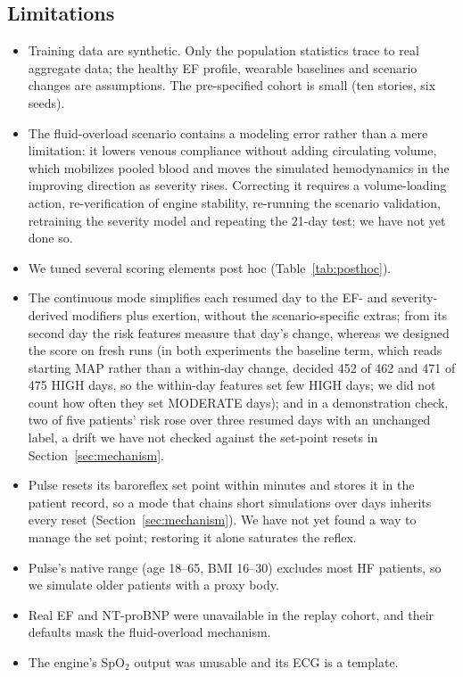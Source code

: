 \documentclass[conference]{IEEEtran}
\begin{document}
\subsection{Limitations}\label{sec:limits}
\begin{itemize}
\item Training data are synthetic. Only the population statistics trace to real aggregate data; the healthy EF profile, wearable baselines and scenario changes are assumptions. The pre-specified cohort is small (ten stories, six seeds).
\item The fluid-overload scenario contains a modeling error rather than a mere limitation: it lowers venous compliance without adding circulating volume, which mobilizes pooled blood and moves the simulated hemodynamics in the improving direction as severity rises. Correcting it requires a volume-loading action, re-verification of engine stability, re-running the scenario validation, retraining the severity model and repeating the 21-day test; we have not yet done so.
\item We tuned several scoring elements post hoc (Table~\ref{tab:posthoc}).
\item The continuous mode simplifies each resumed day to the EF- and severity-derived modifiers plus exertion, without the scenario-specific extras; from its second day the risk features measure that day's change, whereas we designed the score on fresh runs (in both experiments the baseline term, which reads starting MAP rather than a within-day change, decided 452 of 462 and 471 of 475 HIGH days, so the within-day features set few HIGH days; we did not count how often they set MODERATE days); and in a demonstration check, two of five patients' risk rose over three resumed days with an unchanged label, a drift we have not checked against the set-point resets in Section~\ref{sec:mechanism}.
\item Pulse resets its baroreflex set point within minutes and stores it in the patient record, so a mode that chains short simulations over days inherits every reset (Section~\ref{sec:mechanism}). We have not yet found a way to manage the set point; restoring it alone saturates the reflex.
\item Pulse's native range (age 18--65, BMI 16--30) excludes most HF patients, so we simulate older patients with a proxy body.
\item Real EF and NT-proBNP were unavailable in the replay cohort, and their defaults mask the fluid-overload mechanism.
\item The engine's SpO$_2$ output was unusable and its ECG is a template.

\end{itemize}
\end{document}

